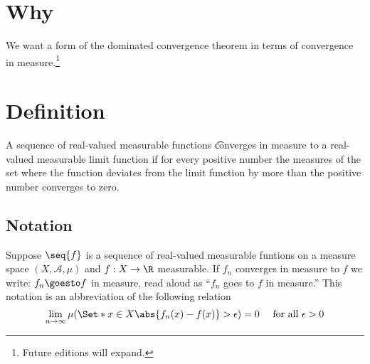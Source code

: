 
\section*{Why}

We want a form of the dominated convergence theorem in terms of convergence in measure.\footnote{Future editions will expand.}

\section*{Definition}

A sequence of real-valued measurable functions \t{converges in measure} to a real-valued measurable limit function if for every positive number the measures of the set where the function deviates from the limit function by more than the positive number converges to zero.

\subsection*{Notation}

Suppose $\seq{f}$ is a sequence of real-valued measurable funtions on a measure space $(X, \mathcal{A} , \mu )$ and $f: X \to \R $ measurable.
If $f_n$ converges in measure to $f$ we write: $f_n \goesto f$ in measure, read aloud as ``$f_n$ goes to $f$ in measure.''
This notation is an abbreviation of the following relation
\[
\lim_{n \to \infty} \mu (\Set*{x \in X}{\abs{f_n(x) - f(x)} > \epsilon }) = 0 \quad \text{ for all } \epsilon  > 0
\]

\blankpage
